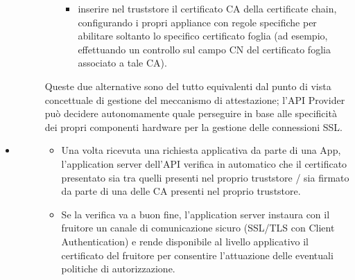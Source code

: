 \documentclass[letterpaper,10pt,italian]{sphinxmanual}
\begin{document}
\begin{itemize}
\begin{description}
\begin{itemize}
\begin{itemize}
\item {} 
inserire nel truststore il certificato CA della certificate chain, configurando i propri appliance con regole specifiche per abilitare soltanto lo specifico certificato foglia (ad esempio, effettuando un controllo sul campo CN del certificato foglia associato a tale CA).

\end{itemize}

\end{itemize}

Queste due alternative sono del tutto equivalenti dal punto di vista concettuale di gestione del meccanismo di attestazione; l’API Provider può decidere autonomamente quale perseguire in base alle specificità dei propri componenti hardware per la gestione delle connessioni SSL.

\end{description}

\item {} \begin{description}
\item[{}] \leavevmode\begin{itemize}
\item {} 
Una volta ricevuta una richiesta applicativa da parte di una App, l’application server dell’API verifica in automatico che il certificato presentato sia tra quelli presenti nel proprio truststore / sia firmato da parte di una delle CA presenti nel proprio truststore.

\item {} 
Se la verifica va a buon fine, l’application server instaura con il fruitore un canale di comunicazione sicuro (SSL/TLS con Client Authentication) e rende disponibile al livello applicativo il certificato del fruitore per consentire l’attuazione delle eventuali politiche di autorizzazione.

\end{itemize}

\end{description}

\end{itemize}
\end{document}
